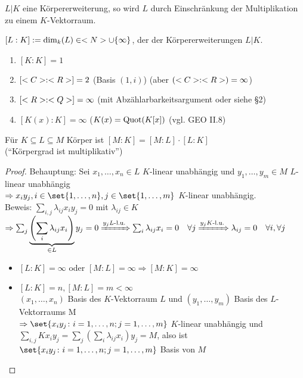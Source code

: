 \begin{remark}
	$L\vert K$ eine Körpererweiterung, so wird $L$ durch Einschränkung der Multiplikation zu einem $K$-Vektorraum.
\end{remark}

\begin{definition}[Körpergrad]
	$[L:K]:= \dim_k(L) \in <N> \cup \{\infty\}$, der  der Körpererweiterungen $L\vert K$.
\end{definition}

\begin{example}
	\begin{enumerate}[label=(\alph*)]
		\item $[K: K] = 1$
		\item $[<C>:<R>] = 2$ (Basis $(1,i)$) (aber $(<C>:<R>) = \infty$)
		\item $[<R>:<Q>] = \infty$ (mit Abzählarbarkeitsargument oder siehe §2) %
		\item $[K(x):K] = \infty$ ($K(x) = \operatorname{Quot}(K[x])$ (vgl. GEO II.8)
	\end{enumerate}
\end{example}

\begin{proposition}
	Für $K \subseteq L \subseteq M$ Körper ist $[M:K] = [M:L]\cdot [L:K]$ \\
	(``Körpergrad ist multiplikativ'')
\end{proposition}

\begin{proof} %
	Behauptung: Sei $x_1, \dots, x_n \in L$ $K$-linear unabhängig und $y_1, \dots, y_m \in M$ $L$-linear unabhängig\\
	$\Rightarrow x_i y_j, i \in \set{1,\dots,n}, j \in \set{1, \dots, m}$ $K$-linear unabhängig.\\
	Beweis: $\sum_{i,j} \lambda_{ij}x_i y_j = 0$ mit $\lambda_{ij} \in K$\\
	$\Rightarrow \sum_{j}\underbrace{\left( \sum_{i} \lambda_{ij}x_i \right)}_{\in L}y_j = 0 
	\xRightarrow{y_j L\text{-l.u.}} \sum_{i} \lambda_{ij} x_i = 0\quad\forall j
	\xRightarrow{y_j K\text{-l.u.}} \lambda_{ij} = 0\quad\forall i, \forall j$
	\begin{itemize}
		\item $[L:K] = \infty$ oder $[M:L] = \infty \Rightarrow [M:K] = \infty$
		\item $[L:K] = n, [M:L] = m < \infty$\\
		$(x_1, \dots, x_n)$ Basis des $K$-Vektorraum $L$ und $(y_1, \dots, y_m)$ Basis des $L$-Vektorraums M\\
		$\Rightarrow \set{x_i y_j \colon i = 1, \dots, n; j = 1, \dots, m}$ $K$-linear unabhängig und \\
		$\sum_{i,j} Kx_i y_j = \sum_{j}\left( \sum_{i} \lambda_{ij}x_i \right)y_j = M$, also ist \\
		$\set{x_i y_j \colon i = 1, \dots ,n; j = 1, \dots, m}$ Basis von $M$ 
	\end{itemize}
\end{proof}

